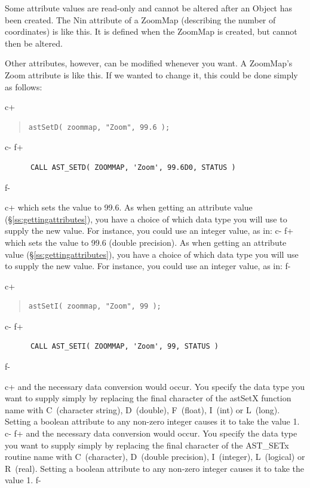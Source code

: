 \documentclass[twoside,11pt]{article}
\newcommand{\secref}[1]{\S\ref{#1}}
\newcommand{\secref}[1]{\ref{#1}}
\begin{document}
Some attribute values are read-only and cannot be altered after an
Object has been created. The Nin attribute of a ZoomMap (describing
the number of coordinates) is like this. It is defined when the
ZoomMap is created, but cannot then be altered.

Other attributes, however, can be modified whenever you want. A
ZoomMap's Zoom attribute is like this. If we wanted to change it, this
could be done simply as follows:

c+
\begin{quote}
\small
\begin{verbatim}
astSetD( zoommap, "Zoom", 99.6 );
\end{verbatim}
\normalsize
\end{quote}
c-
f+
\small
\begin{verbatim}
      CALL AST_SETD( ZOOMMAP, 'Zoom', 99.6D0, STATUS )
\end{verbatim}
\normalsize
f-

c+
which sets the value to 99.6. As when getting an attribute value
(\secref{ss:gettingattributes}), you have a choice of which data type
you will use to supply the new value. For instance, you could use an
integer value, as in:
c-
f+
which sets the value to 99.6 (double precision). As when getting an
attribute value (\secref{ss:gettingattributes}), you have a choice of
which data type you will use to supply the new value. For instance,
you could use an integer value, as in:
f-

c+
\begin{quote}
\small
\begin{verbatim}
astSetI( zoommap, "Zoom", 99 );
\end{verbatim}
\normalsize
\end{quote}
c-
f+
\small
\begin{verbatim}
      CALL AST_SETI( ZOOMMAP, 'Zoom', 99, STATUS )
\end{verbatim}
\normalsize
f-

c+
and the necessary data conversion would occur.  You specify the data
type you want to supply simply by replacing the final character of the
astSetX function name with C~(character string), D~(double),
F~(float), I~(int) or L~(long). Setting a boolean attribute to any
non-zero integer causes it to take the value 1.
c-
f+
and the necessary data conversion would occur.  You specify the data
type you want to supply simply by replacing the final character of the
AST\_SETx routine name with C~(character), D~(double precision),
I~(integer), L~(logical) or R~(real).  Setting a boolean attribute to
any non-zero integer causes it to take the value 1.
f-
\end{document}
